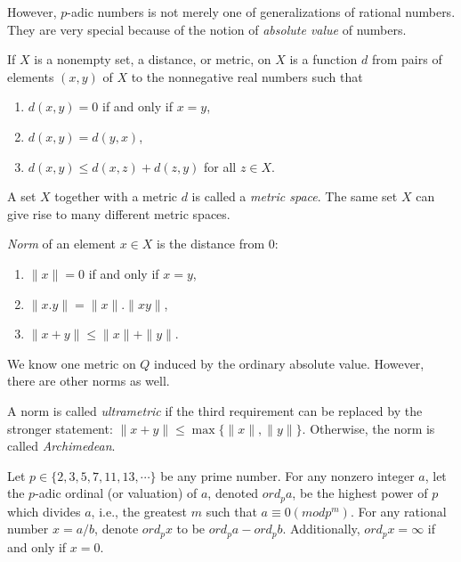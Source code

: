 \documentclass{llncs}
\begin{document}
However, $p$-adic numbers is not merely one of generalizations of rational numbers. They are very special because of the notion 
of {\em absolute value} of numbers. 


If $X$ is a nonempty set, a distance, or {metric}, on $X$ is a function $d$ from pairs of elements $(x,y)$ of $X$
to the nonnegative real numbers such that 
\begin{enumerate}
\item $d(x,y) = 0$ if and only if $x = y$,\\
\item $d(x,y) = d(y,x)$,\\
\item $d(x,y) \leq d(x,z) + d(z,y)$ for all $z \in X$.
\end{enumerate}

A set $X$ together with a metric $d$ is called a {\em metric space}. The same set $X$ can give rise to many different metric spaces.


{\em Norm} of an element $x \in X$ is the distance from $0$:
\begin{enumerate}
\item $\parallel x \parallel = 0$ if and only if $x = y$,\\
\item $\parallel x.y \parallel = \parallel x \parallel . \parallel xy \parallel $,\\
\item $\parallel x+y \parallel  \leq \parallel x \parallel  + \parallel y \parallel $.
\end{enumerate}

We know one metric on $Q$  induced by the ordinary absolute value. However, there are other norms as well.

A norm  is called {\em ultrametric}  if the third requirement can be replaced by the stronger statement:
$\parallel x+y \parallel  \leq \max \{\parallel x \parallel  , \parallel y \parallel \}$.
Otherwise, the norm is called {\em Archimedean}.

\begin{definition}
Let $p \in \{2,3,5,7,11,13,\cdots \}$ be any prime number. For any nonzero integer $a$, let the $p$-adic ordinal (or valuation) of $a$, denoted $ord_p a$, 
be the highest power of $p$ which divides $a$, i.e., the greatest $m$ such that $a \equiv 0 (mod p^{m})$. For any rational number $x = a/b$, 
denote $ord_p x$ to be $ord_p a - ord_p b$. Additionally, $ord_p x = \infty $ if and only if $x = 0$.
\end{definition}
\end{document}
